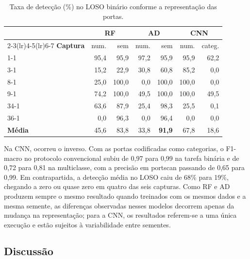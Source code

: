 \documentclass[alpha-refs,brazilian]{CC-EC_TF-TC}
\begin{document}
\begin{table}[htbp]
\centering
\caption{Taxa de detecção (\%) no LOSO binário conforme a representação das portas.}
\label{tab:portascap}
\small
\setlength{\tabcolsep}{3.5pt}
\begin{tabular}{lrrrrrr}
\toprule
 & \multicolumn{2}{c}{\textbf{RF}} & \multicolumn{2}{c}{\textbf{AD}} & \multicolumn{2}{c}{\textbf{CNN}} \\
\cmidrule(lr){2-3}\cmidrule(lr){4-5}\cmidrule(lr){6-7}
\textbf{Captura} & num. & sem & num. & sem & num. & categ. \\
\midrule
1-1  & 95,4 & 95,9  & 97,2 & 95,9  & 95,9  & 62,2 \\
3-1  & 15,2 & 22,9  & 30,8 & 60,8  & 85,2  &  0,0 \\
8-1  & 25,0 & 100,0 &  0,0 & 100,0 & 100,0 &  0,0 \\
9-1  & 74,2 & 100,0 & 49,5 & 100,0 & 100,0 & 49,5 \\
34-1 & 63,6 & 87,9  & 25,4 & 98,3  & 25,5  &  0,1 \\
36-1 &  0,0 & 96,3  &  0,0 & 96,4  &  0,0  &  0,0 \\
\midrule
\textbf{Média} & 45,6 & 83,8 & 33,8 & \textbf{91,9} & 67,8 & 18,6 \\
\bottomrule
\end{tabular}
\end{table}

Na CNN, ocorreu o inverso. Com as portas codificadas como categorias, o F1-macro no protocolo convencional subiu de 0,97 para 0,99 na tarefa binária e de 0,72 para 0,81 na multiclasse, com a precisão em portscan passando de 0,65 para 0,99. Em contrapartida, a detecção média no LOSO caiu de 68\% para 19\%, chegando a zero ou quase zero em quatro das seis capturas. Como RF e AD produzem sempre o mesmo resultado quando treinados com os mesmos dados e a mesma semente, as diferenças observadas nesses modelos decorrem apenas da mudança na representação; para a CNN, os resultados referem-se a uma única execução e estão sujeitos à variabilidade entre sementes.


\subsection{Discussão}
\label{sec:discussao}
\end{document}
